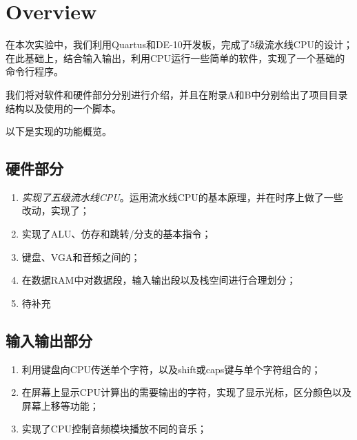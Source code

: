 \chapter{Overview}
\kaishu
\hspace*{9mm}在本次实验中，我们利用Quartus和DE-10开发板，完成了5级流水线CPU的设计；
在此基础上，结合输入输出，利用CPU运行一些简单的软件，实现了一个基础的
命令行程序。

我们将对软件和硬件部分分别进行介绍，并且在附录A和B中分别给出了项目目录结构以及使用的一个脚本。

以下是实现的功能概览。
\section{硬件部分}
\songti
\begin{enumerate}
    \item \emph{实现了五级流水线CPU}。运用流水线CPU的基本原理，并在时序上做了一些
改动，实现了；
    \item 实现了ALU、仿存和跳转/分支的基本指令；
    \item 键盘、VGA和音频之间的；
    \item 在数据RAM中对数据段，输入输出段以及栈空间进行合理划分；
    \item 待补充
\end{enumerate}
\section{输入输出部分}
\begin{enumerate}
    \item 利用键盘向CPU传送单个字符，以及shift或caps键与单个字符组合的；
    \item 在屏幕上显示CPU计算出的需要输出的字符，实现了显示光标，区分颜色以及屏幕上移等功能；
    \item 实现了CPU控制音频模块播放不同的音乐；
\end{enumerate}

